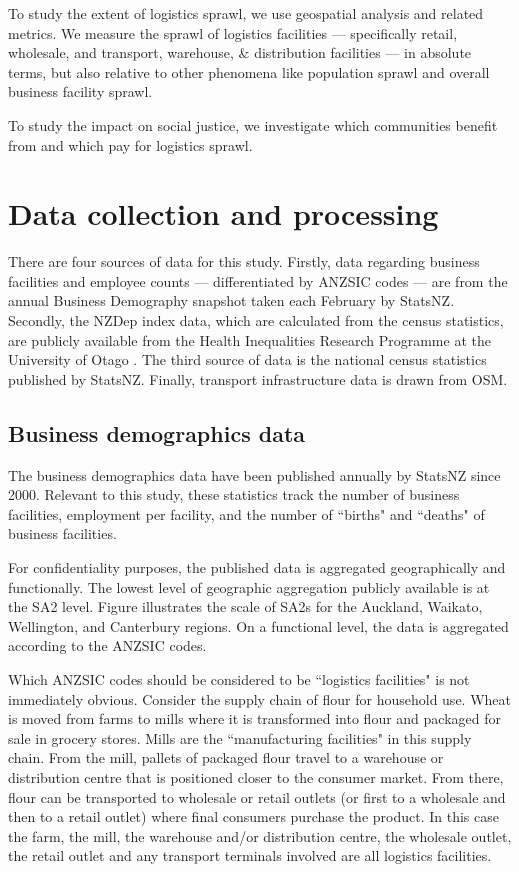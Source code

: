 \documentclass[3p, a4paper, authoryear, 11pt, fleqn, review]{elsarticle}
\newcommand{\nmt}[1]{{\color{red}{~(nmt: #1)}}}
\begin{document}
To study the extent of logistics sprawl, we use geospatial analysis and related metrics. We measure the sprawl of logistics facilities --- specifically retail, wholesale, and transport, warehouse, \& distribution facilities  --- in absolute terms, but also relative to other phenomena like population sprawl and overall business facility sprawl. 

To study the impact on social justice, we investigate which communities benefit from and which pay for logistics sprawl. \nmt{...}

\section{Data collection and processing}
There are four sources of data for this study. Firstly, data regarding business facilities and employee counts --- differentiated by \ac{ANZSIC} codes --- are from the annual Business Demography snapshot taken each February by StatsNZ. Secondly, the \ac{NZDep} index data, which are calculated from the census statistics, are publicly available from the Health Inequalities Research Programme at the University of Otago \nmt{insert ref}. The third source of data is the national census statistics published by StatsNZ. Finally, transport infrastructure data is drawn from \ac{OSM}.

\subsection{Business demographics data}
The business demographics data have been published annually by StatsNZ since 2000. Relevant to this study, these statistics track the number of business facilities, employment per facility, and the number of ``births" and ``deaths" of business facilities. 

For confidentiality purposes, the published data is aggregated geographically and functionally. The lowest level of geographic aggregation publicly available is at the \ac{SA2} level. Figure \nmt{xx} illustrates the scale of \acp{SA2} for the Auckland, Waikato, Wellington, and Canterbury regions. On a functional \nmt{?} level, the data is aggregated according to the \ac{ANZSIC} codes. 

Which \ac{ANZSIC} codes should be considered to be ``logistics facilities" is not immediately obvious. Consider the supply chain of flour for household use. Wheat is moved from farms to mills where it is transformed into flour and packaged for sale in grocery stores. Mills are the ``manufacturing facilities" in this supply chain. From the mill, pallets of packaged flour travel to a warehouse or distribution centre that is positioned closer to the consumer market. From there, flour can be transported to wholesale or retail outlets (or first to a wholesale and then to a retail outlet) where final consumers purchase the product. In this case the farm, the mill, the warehouse and/or distribution centre, the wholesale outlet, the retail outlet and any transport terminals involved are all logistics facilities.
\end{document}
